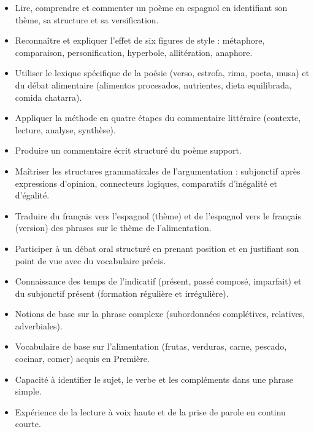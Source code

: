 \documentclass[11pt]{article}
\begin{document}
\begin{objectifs}
\begin{itemize}
\item Lire, comprendre et commenter un poème en espagnol en identifiant son thème, sa structure et sa versification.
\item Reconnaître et expliquer l'effet de six figures de style : métaphore, comparaison, personification, hyperbole, allitération, anaphore.
\item Utiliser le lexique spécifique de la poésie (verso, estrofa, rima, poeta, musa) et du débat alimentaire (alimentos procesados, nutrientes, dieta equilibrada, comida chatarra).
\item Appliquer la méthode en quatre étapes du commentaire littéraire (contexte, lecture, analyse, synthèse).
\item Produire un commentaire écrit structuré du poème support.
\item Maîtriser les structures grammaticales de l'argumentation : subjonctif après expressions d'opinion, connecteurs logiques, comparatifs d'inégalité et d'égalité.
\item Traduire du français vers l'espagnol (thème) et de l'espagnol vers le français (version) des phrases sur le thème de l'alimentation.
\item Participer à un débat oral structuré en prenant position et en justifiant son point de vue avec du vocabulaire précis.
\end{itemize}
\end{objectifs}

\begin{prerequis}
\begin{itemize}
\item Connaissance des temps de l'indicatif (présent, passé composé, imparfait) et du subjonctif présent (formation régulière et irrégulière).
\item Notions de base sur la phrase complexe (subordonnées complétives, relatives, adverbiales).
\item Vocabulaire de base sur l'alimentation (frutas, verduras, carne, pescado, cocinar, comer) acquis en Première.
\item Capacité à identifier le sujet, le verbe et les compléments dans une phrase simple.
\item Expérience de la lecture à voix haute et de la prise de parole en continu courte.
\end{itemize}
\end{prerequis}
\end{document}
